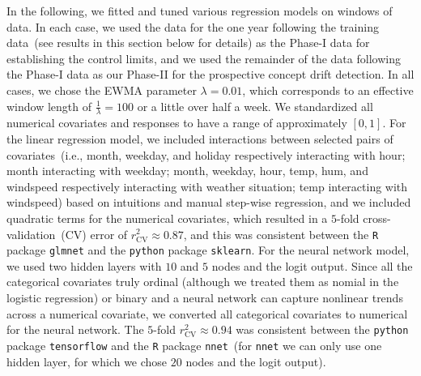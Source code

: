 \documentclass[twoside,11pt]{article}
\begin{document}
In the following, we fitted and tuned various regression models on windows of data. In each case, we used the data for the one year following the training data~(see results in this section below for details) as the Phase-I data for establishing the control limits, and we used the remainder of the data following the Phase-I data as our Phase-II for the prospective concept drift detection. In all cases, we chose the EWMA parameter $ \lambda = 0.01$, which corresponds to an effective window length of $\frac{1}{\lambda}=100$ or a little over half a week. We standardized all numerical covariates and responses to have a range of approximately $[0,1]$. For the linear regression model, we included interactions between selected pairs of covariates~(i.e., month, weekday, and holiday respectively interacting with hour; month interacting with weekday; month, weekday, hour, temp, hum, and windspeed respectively interacting with weather situation; temp interacting with windspeed) based on intuitions and manual step-wise regression, and we included quadratic terms for the numerical covariates, %
which resulted in a $5$-fold cross-validation~(CV) error of $r^2_{\mathrm{CV}} \approx 0.87$, and this was consistent between the \texttt{R} package \texttt{glmnet} and the \texttt{python} package \texttt{sklearn}. For the neural network model, we used two hidden layers with $10$ and $5$ nodes and the logit output. Since all the categorical covariates truly ordinal (although we treated them as nomial in the logistic regression) or binary and a neural network can capture nonlinear trends across a numerical covariate, we converted all categorical covariates to numerical for the neural network. The $5$-fold $r^2_{\mathrm{CV}} \approx 0.94$ was consistent between the \texttt{python} package \texttt{tensorflow} and the \texttt{R} package \texttt{nnet}~(for \texttt{nnet} we can only use one hidden layer, for which we chose $20$ nodes and the logit output). %
\end{document}

